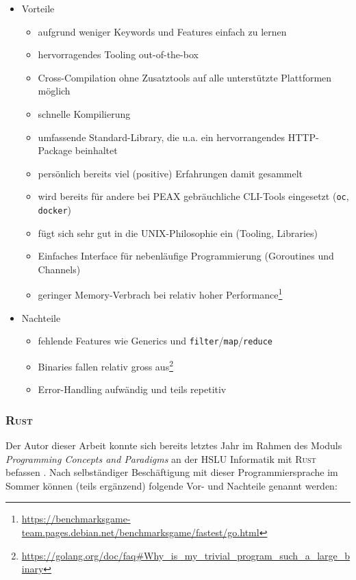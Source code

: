 \begin{itemize}
	\item Vorteile
		\begin{itemize}
			\item aufgrund weniger Keywords und Features einfach zu lernen
			\item hervorragendes Tooling out-of-the-box
			\item Cross-Compilation ohne Zusatztools auf alle unterstützte Plattformen möglich
			\item schnelle Kompilierung
			\item umfassende Standard-Library, die u.a. ein hervorrangendes HTTP-Package beinhaltet
			\item persönlich bereits viel (positive) Erfahrungen damit gesammelt
			\item wird bereits für andere bei PEAX gebräuchliche CLI-Tools eingesetzt (\texttt{oc}, \texttt{docker})
			\item fügt sich sehr gut in die UNIX-Philosophie ein (Tooling, Libraries)
			\item Einfaches Interface für nebenläufige Programmierung (\textsc{Go}routines und Channels)
			\item geringer Memory-Verbrach bei relativ hoher Performance\footnote{\url{https://benchmarksgame-team.pages.debian.net/benchmarksgame/fastest/go.html}}
		\end{itemize}
	\item Nachteile
		\begin{itemize}
			\item fehlende Features wie Generics und \texttt{filter}/\texttt{map}/\texttt{reduce}
			\item Binaries fallen relativ gross aus\footnote{\url{https://golang.org/doc/faq\#Why\_is\_my\_trivial\_program\_such\_a\_large\_binary}}
			\item Error-Handling aufwändig und teils repetitiv
		\end{itemize}
\end{itemize}

\subsubsection{\textsc{Rust}}

Der Autor dieser Arbeit konnte sich bereits letztes Jahr im Rahmen des Moduls \textit{Programming Concepts and Paradigms} an der HSLU Informatik mit \textsc{Rust} befassen \cite[p. 12]{pcp-rust}. Nach selbständiger Beschäftigung mit dieser Programmiersprache im Sommer können (teils ergänzend) folgende Vor- und Nachteile genannt werden:

